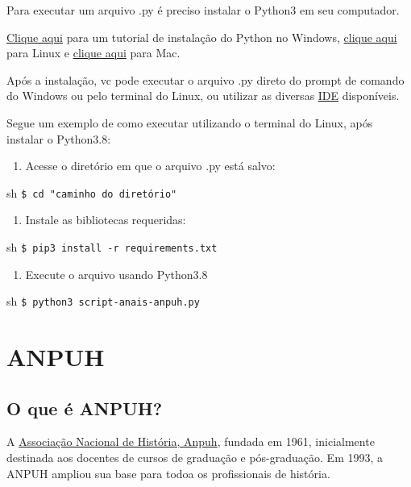 \documentclass[
]{book}
\providecommand{\tightlist}{%
  \setlength{\itemsep}{0pt}\setlength{\parskip}{0pt}}
\begin{document}
Para executar um arquivo .py é preciso instalar o Python3 em seu computador.

\href{https://python.org.br/instalacao-windows/}{Clique aqui} para um tutorial de instalação do Python no Windows, \href{https://python.org.br/instalacao-linux/}{clique aqui} para Linux e \href{https://python.org.br/instalacao-mac/}{clique aqui}
para Mac.

Após a instalação, vc pode executar o arquivo .py direto do prompt de comando do Windows ou pelo terminal do Linux, ou utilizar as diversas \href{https://pt.wikipedia.org/wiki/Ambiente_de_desenvolvimento_integrado}{IDE} disponíveis.

Segue um exemplo de como executar utilizando o terminal do Linux, após instalar o Python3.8:

\begin{enumerate}
\def\labelenumi{\arabic{enumi}.}
\tightlist
\item
  Acesse o diretório em que o arquivo .py está salvo:
\end{enumerate}

sh
\texttt{\$\ cd\ "caminho\ do\ diretório"}

\begin{enumerate}
\def\labelenumi{\arabic{enumi}.}
\tightlist
\item
  Instale as bibliotecas requeridas:
\end{enumerate}

sh
\texttt{\$\ pip3\ install\ -r\ requirements.txt}

\begin{enumerate}
\def\labelenumi{\arabic{enumi}.}
\tightlist
\item
  Execute o arquivo usando Python3.8
\end{enumerate}

sh
\texttt{\$\ python3\ script-anais-anpuh.py}

\hypertarget{anpuh}{%
\chapter{ANPUH}\label{anpuh}}

\hypertarget{o-que-uxe9-anpuh}{%
\section{O que é ANPUH?}\label{o-que-uxe9-anpuh}}

A \href{https://anpuh.org.br/index.php}{Associação Nacional de História, Anpuh}, fundada em 1961, inicialmente destinada aos docentes de cursos de graduação e pós-graduação. Em 1993, a ANPUH ampliou sua base para todoa os profissionais de história.
\end{document}
